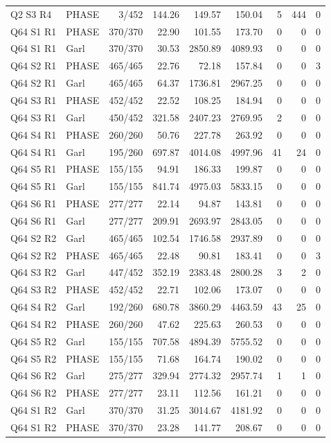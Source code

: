 \begin{longtable}{llrrrrrrr}
Q2 S3 R4 & PHASE & 3/452 & 144.26 & 149.57 & 150.04 & 5 & 444 & 0 \\
Q64 S1 R1 & PHASE & 370/370 & 22.90 & 101.55 & 173.70 & 0 & 0 & 0 \\
Q64 S1 R1 & Garl & 370/370 & 30.53 & 2850.89 & 4089.93 & 0 & 0 & 0 \\
Q64 S2 R1 & PHASE & 465/465 & 22.76 & 72.18 & 157.84 & 0 & 0 & 3 \\
Q64 S2 R1 & Garl & 465/465 & 64.37 & 1736.81 & 2967.25 & 0 & 0 & 0 \\
Q64 S3 R1 & PHASE & 452/452 & 22.52 & 108.25 & 184.94 & 0 & 0 & 0 \\
Q64 S3 R1 & Garl & 450/452 & 321.58 & 2407.23 & 2769.95 & 2 & 0 & 0 \\
Q64 S4 R1 & PHASE & 260/260 & 50.76 & 227.78 & 263.92 & 0 & 0 & 0 \\
Q64 S4 R1 & Garl & 195/260 & 697.87 & 4014.08 & 4997.96 & 41 & 24 & 0 \\
Q64 S5 R1 & PHASE & 155/155 & 94.91 & 186.33 & 199.87 & 0 & 0 & 0 \\
Q64 S5 R1 & Garl & 155/155 & 841.74 & 4975.03 & 5833.15 & 0 & 0 & 0 \\
Q64 S6 R1 & PHASE & 277/277 & 22.14 & 94.87 & 143.81 & 0 & 0 & 0 \\
Q64 S6 R1 & Garl & 277/277 & 209.91 & 2693.97 & 2843.05 & 0 & 0 & 0 \\
Q64 S2 R2 & Garl & 465/465 & 102.54 & 1746.58 & 2937.89 & 0 & 0 & 0 \\
Q64 S2 R2 & PHASE & 465/465 & 22.48 & 90.81 & 183.41 & 0 & 0 & 3 \\
Q64 S3 R2 & Garl & 447/452 & 352.19 & 2383.48 & 2800.28 & 3 & 2 & 0 \\
Q64 S3 R2 & PHASE & 452/452 & 22.71 & 102.06 & 173.07 & 0 & 0 & 0 \\
Q64 S4 R2 & Garl & 192/260 & 680.78 & 3860.29 & 4463.59 & 43 & 25 & 0 \\
Q64 S4 R2 & PHASE & 260/260 & 47.62 & 225.63 & 260.53 & 0 & 0 & 0 \\
Q64 S5 R2 & Garl & 155/155 & 707.58 & 4894.39 & 5755.52 & 0 & 0 & 0 \\
Q64 S5 R2 & PHASE & 155/155 & 71.68 & 164.74 & 190.02 & 0 & 0 & 0 \\
Q64 S6 R2 & Garl & 275/277 & 329.94 & 2774.32 & 2957.74 & 1 & 1 & 0 \\
Q64 S6 R2 & PHASE & 277/277 & 23.11 & 112.56 & 161.21 & 0 & 0 & 0 \\
Q64 S1 R2 & Garl & 370/370 & 31.25 & 3014.67 & 4181.92 & 0 & 0 & 0 \\
Q64 S1 R2 & PHASE & 370/370 & 23.28 & 141.77 & 208.67 & 0 & 0 & 0 \\
\bottomrule
\end{longtable}
